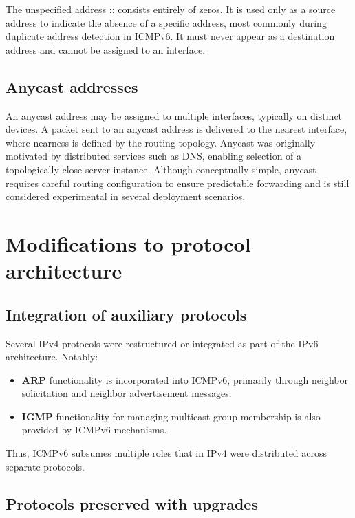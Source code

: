 \documentclass[11pt,a4paper,openany]{report}
\begin{document}
The unspecified address :: consists entirely of zeros. It is used only as a source address to indicate the absence of a specific address, most commonly during duplicate address detection in ICMPv6. It must never appear as a destination address and cannot be assigned to an interface.

\subsection{Anycast addresses}

An anycast address may be assigned to multiple interfaces, typically on distinct devices. A packet sent to an anycast address is delivered to the nearest interface, where nearness is defined by the routing topology. Anycast was originally motivated by distributed services such as DNS, enabling selection of a topologically close server instance. Although conceptually simple, anycast requires careful routing configuration to ensure predictable forwarding and is still considered experimental in several deployment scenarios.

\section{Modifications to protocol architecture}

\subsection{Integration of auxiliary protocols}

Several IPv4 protocols were restructured or integrated as part of the IPv6 architecture. Notably:

\begin{itemize}
\item \textbf{ARP} functionality is incorporated into ICMPv6, primarily through neighbor solicitation and neighbor advertisement messages.
\item \textbf{IGMP} functionality for managing multicast group membership is also provided by ICMPv6 mechanisms.
\end{itemize}

Thus, ICMPv6 subsumes multiple roles that in IPv4 were distributed across separate protocols.

\subsection{Protocols preserved with upgrades}
\end{document}
